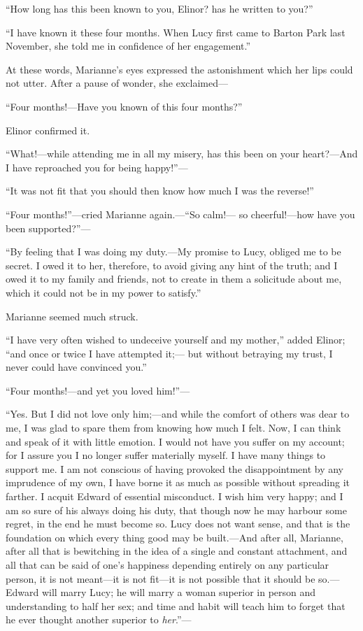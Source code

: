 ``How long has this been known to you, Elinor? has
he written to you?''

``I have known it these four months.  When Lucy
first came to Barton Park last November, she told me
in confidence of her engagement.''

At these words, Marianne's eyes expressed the astonishment
which her lips could not utter.  After a pause of wonder,
she exclaimed---%

``Four months!---Have you known of this four months?''

Elinor confirmed it.

``What!---while attending me in all my misery, has this
been on your heart?---And I have reproached you for being
happy!''---%

``It was not fit that you should then know how much
I was the reverse!''

``Four months!''---cried Marianne again.---``So calm!---%
so cheerful!---how have you been supported?''---%

``By feeling that I was doing my duty.---My promise to
Lucy, obliged me to be secret.  I owed it to her, therefore,
to avoid giving any hint of the truth; and I owed it to my
family and friends, not to create in them a solicitude about me,
which it could not be in my power to satisfy.''

Marianne seemed much struck.

``I have very often wished to undeceive yourself and my
mother,'' added Elinor; ``and once or twice I have attempted it;---%
but without betraying my trust, I never could have convinced
you.''

``Four months!---and yet you loved him!''---%

``Yes. But I did not love only him;---and while the comfort
of others was dear to me, I was glad to spare them from knowing
how much I felt.  Now, I can think and speak of it with
little emotion.  I would not have you suffer on my account;
for I assure you I no longer suffer materially myself.
I have many things to support me.  I am not conscious of having
provoked the disappointment by any imprudence of my own,
I have borne it as much as possible without spreading
it farther.  I acquit Edward of essential misconduct.
I wish him very happy; and I am so sure of his always
doing his duty, that though now he may harbour some regret,
in the end he must become so.  Lucy does not want sense,
and that is the foundation on which every thing good may
be built.---And after all, Marianne, after all that is
bewitching in the idea of a single and constant attachment,
and all that can be said of one's happiness depending
entirely on any particular person, it is not meant---it
is not fit---it is not possible that it should be so.---%
Edward will marry Lucy; he will marry a woman superior
in person and understanding to half her sex; and time
and habit will teach him to forget that he ever thought
another superior to \emph{her}.''---%

